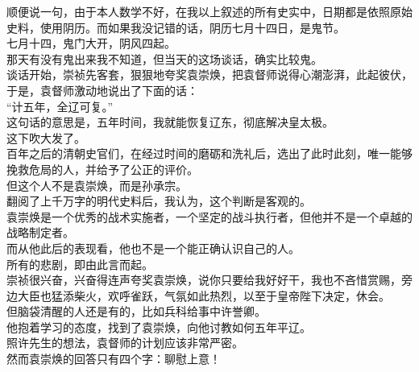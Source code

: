 \begin{multicols}{\theparacolNo}
顺便说一句，由于本人数学不好，在我以上叙述的所有史实中，日期都是依照原始史料，使用阴历。而如果我没记错的话，阴历七月十四日，是鬼节。\\

七月十四，鬼门大开，阴风四起。\\

那天有没有鬼出来我不知道，但当天的这场谈话，确实比较鬼。\\

谈话开始，崇祯先客套，狠狠地夸奖袁崇焕，把袁督师说得心潮澎湃，此起彼伏，于是，袁督师激动地说出了下面的话：\\

“计五年，全辽可复。”\\

这句话的意思是，五年时间，我就能恢复辽东，彻底解决皇太极。\\

这下吹大发了。\\

百年之后的清朝史官们，在经过时间的磨砺和洗礼后，选出了此时此刻，唯一能够挽救危局的人，并给予了公正的评价。\\

但这个人不是袁崇焕，而是孙承宗。\\

翻阅了上千万字的明代史料后，我认为，这个判断是客观的。\\

袁崇焕是一个优秀的战术实施者，一个坚定的战斗执行者，但他并不是一个卓越的战略制定者。\\

而从他此后的表现看，他也不是一个能正确认识自己的人。\\

所有的悲剧，即由此言而起。\\

崇祯很兴奋，兴奋得连声夸奖袁崇焕，说你只要给我好好干，我也不吝惜赏赐，旁边大臣也猛添柴火，欢呼雀跃，气氛如此热烈，以至于皇帝陛下决定，休会。\\

但脑袋清醒的人还是有的，比如兵科给事中许誉卿。\\

他抱着学习的态度，找到了袁崇焕，向他讨教如何五年平辽。\\

照许先生的想法，袁督师的计划应该非常严密。\\

然而袁崇焕的回答只有四个字：聊慰上意！\\


\end{multicols}
